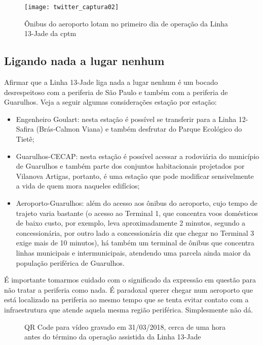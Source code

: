 \documentclass[11pt,fleqn]{book} %
\begin{document}
\begin{figure}[htb]
	\caption[Ônibus lotados do aeroporto internacional]{Ônibus do aeroporto lotam no primeiro dia de operação da Linha 13-Jade da \gls{cptm}}
	\centering
	\texttt{[image: twitter\_captura02]}
	\label{fig:twitter_captura02}
\end{figure}

\subsection{Ligando nada a lugar nenhum}

Afirmar que a Linha 13-Jade liga nada a lugar nenhum é um bocado desrespeitoso com a periferia de São Paulo e também com a periferia de Guarulhos. Veja a seguir algumas considerações estação por estação:

\begin{itemize}
	\item Engenheiro Goulart: nesta estação é possível se transferir para a Linha 12-Safira (Brás-Calmon Viana) e também desfrutar do Parque Ecológico do Tietê;
	\item Guarulhos-CECAP: nesta estação é possível acessar a rodoviária do município de Guarulhos e também parte dos conjuntos habitacionais projetados por Vilanova Artigas, portanto, é uma estação que pode modificar sensivelmente a vida de quem mora naqueles edifícios;
	\item Aeroporto-Guarulhos: além do acesso aos ônibus do aeroporto, cujo tempo de trajeto varia bastante (o acesso ao Terminal 1, que concentra voos domésticos de baixo custo, por exemplo, leva aproximadamente 2 minutos, segundo a concessionária, por outro lado a concessionária diz que chegar no Terminal 3 exige mais de 10 minutos), há também um terminal de ônibus que concentra linhas municipais e intermunicipais, atendendo uma parcela ainda maior da população periférica de Guarulhos.
\end{itemize}

É importante tomarmos cuidado com o significado da expressão em questão para não tratar a periferia como nada. É paradoxal querer chegar num aeroporto que está localizado na periferia ao mesmo tempo que se tenta evitar contato com a infraestrutura que atende aquela mesma região periférica. Simplesmente não dá.

\begin{wrapfigure}{l}{0.5\textwidth}
	\centering
	\caption[QR Code para vídeo dos ônibus do aeroporto internacional em 31/03/2018]{QR Code para vídeo gravado em 31/03/2018, cerca de uma hora antes do término da operação assistida da Linha 13-Jade}
	\label{qr:video_aeroporto}
\end{wrapfigure} 
\end{document}
